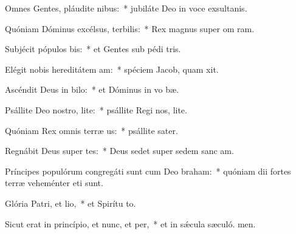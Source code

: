\item Omnes Gentes, pláudite nibus:~* jubiláte Deo in voce exsultanis.
\item Quóniam Dóminus excélsus, terbilis:~* Rex magnus super om ram.
\item Subjécit pópulos bis:~* et Gentes sub pédi tris.
\item Elégit nobis hereditátem am:~* spéciem Jacob, quam xit.
\item Ascéndit Deus in bilo:~* et Dóminus in vo bæ.
\item Psállite Deo nostro, lite:~* psállite Regi nos, lite.
\item Quóniam Rex omnis terræ us:~* psállite sater.
\item Regnábit Deus super tes:~* Deus sedet super sedem sanc am.
\item Príncipes populórum congregáti sunt cum Deo braham:~* quóniam dii fortes terræ veheménter eti sunt.
\item Glória Patri, et lio,~* et Spirítu to.
\item Sicut erat in princípio, et nunc, et per,~* et in sǽcula sæculó. men.

